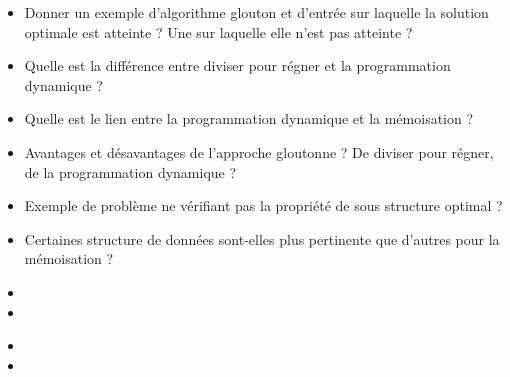 \documentclass{agregfiche}
\begin{document}
\secquestionsclassiques

\begin{itemize}
    \item Donner un exemple d'algorithme glouton et d'entrée sur 
    laquelle la solution optimale est atteinte ? Une sur laquelle 
    elle n'est pas atteinte ?
    \item Quelle est la différence entre diviser pour régner et la programmation dynamique ?
    \item Quelle est le lien entre la programmation dynamique et la mémoisation ?
    \item Avantages et désavantages de l'approche gloutonne ? De diviser pour régner, de la programmation dynamique ?
    \item Exemple de problème ne vérifiant pas la propriété de sous 
    structure optimal ?
    \item Certaines structure de données sont-elles plus pertinente 
    que d'autres pour la mémoisation ?
\end{itemize}

\secreferences

\begin{itemize}
    \item 
    \item 
\end{itemize}

\secdev

\begin{itemize}
    \item 
    \item 
\end{itemize}
\end{document}

